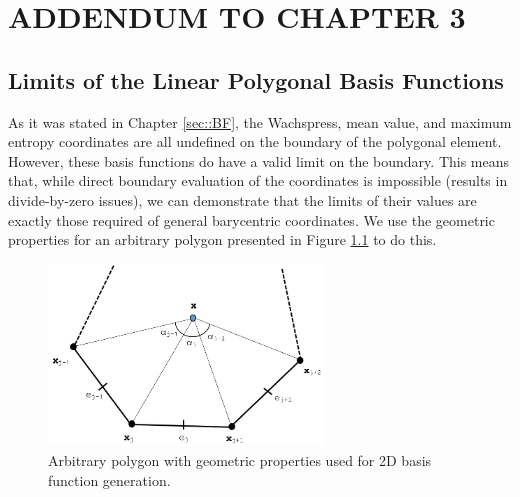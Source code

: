%
%
%

\chapter{\uppercase{Addendum to Chapter 3}}
\label{sec::appendix_BF}

\section{Limits of the Linear Polygonal Basis Functions}
\label{sec::appendix_BF_Limits}

As it was stated in Chapter \ref{sec::BF}, the Wachspress, mean value, and maximum entropy coordinates are all undefined on the boundary of the polygonal element. However, these basis functions do have a valid limit on the boundary. This means that, while direct boundary evaluation of the coordinates is impossible (results in divide-by-zero issues), we can demonstrate that the limits of their values are exactly those required of general barycentric coordinates. We use the geometric properties for an arbitrary polygon presented in Figure \ref{fig::App_BF_2D_ref_polygon} to do this.

\begin{figure}
\centering
\includegraphics[width=0.65\textwidth]{figures/appendices/ref_polygon.png}
\caption{Arbitrary polygon with geometric properties used for 2D basis function generation.}
\label{fig::App_BF_2D_ref_polygon}
\end{figure}

